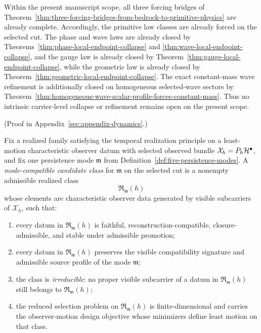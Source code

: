 \begin{corollary}
\label{cor:current-forcing-frontier-for-primitive-physics}
Within the present manuscript scope, all three forcing bridges of
Theorem~\ref{thm:three-forcing-bridges-from-bedrock-to-primitive-physics} are
already complete. Accordingly, the primitive law classes are already forced on
the selected cut. The phase and wave laws are already closed by
Theorems~\ref{thm:phase-local-endpoint-collapse} and
\ref{thm:wave-local-endpoint-collapse}, and the gauge law is already closed
by Theorem~\ref{thm:gauge-local-endpoint-collapse}, while the geometric law
is already closed by
Theorem~\ref{thm:geometric-local-endpoint-collapse}. The exact constant-mass
wave refinement is additionally closed on homogeneous selected-wave sectors by
Theorem~\ref{thm:homogeneous-wave-scalar-profile-forces-constant-mass}. Thus no
intrinsic carrier-level collapse or refinement remains open on the present
scope.
\end{corollary}

(Proof in Appendix~\ref{sec:appendix-dynamics}.)

\begin{definition}
\label{def:mode-compatible-candidate-class}
Fix a realized family satisfying the temporal realization principle on a
least-motion characteristic observer datum with selected observed bundle
\(\mathcal X_h=P_h\mathcal{H}^\bullet\), and fix one persistence mode
\(\mathfrak m\) from Definition~\ref{def:five-persistence-modes}. A
\emph{mode-compatible candidate class} for \(\mathfrak m\) on the selected cut
is a nonempty admissible realized class
\[
\mathfrak R_{\mathfrak m}(h)
\]
whose elements are characteristic observer data generated by visible
subcarriers of \(\mathcal X_h\), such that:
\begin{enumerate}[label=(\roman*), leftmargin=2em, itemsep=0.2em]
\item every datum in \(\mathfrak R_{\mathfrak m}(h)\) is faithful,
      reconstruction-compatible, closure-admissible, and stable under
      admissible promotion;
\item every datum in \(\mathfrak R_{\mathfrak m}(h)\) preserves the visible
      compatibility signature and admissible source profile of the mode
      \(\mathfrak m\);
\item the class is \emph{irreducible}: no proper visible subcarrier of a datum
      in \(\mathfrak R_{\mathfrak m}(h)\) still belongs to
      \(\mathfrak R_{\mathfrak m}(h)\);
\item the reduced selection problem on \(\mathfrak R_{\mathfrak m}(h)\) is
      finite-dimensional and carries the observer-motion design objective whose
      minimizers define least motion on that class.
\end{enumerate}
\end{definition}

